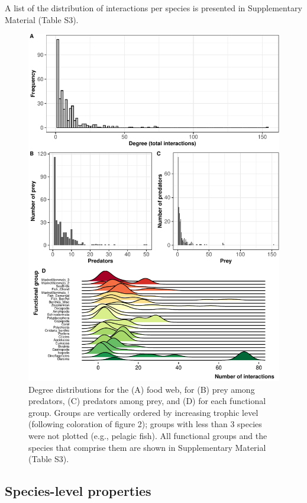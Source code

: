 \documentclass[preprint, 3p,
authoryear]{elsarticle} %
\begin{document}
A list of the distribution of interactions per species is presented in
Supplementary Material (Table S3).

\begin{figure}

{\centering \includegraphics{MS_Burdwood_foodweb_files/figure-latex/figure3-1} 

}

\caption{Degree distributions for the (A) food web, for (B) prey among predators, (C) predators among prey, and (D) for each functional group. Groups are vertically ordered by increasing trophic level (following coloration of figure 2); groups with less than 3 species were not plotted (e.g., pelagic fish). All functional groups and the species that comprise them are shown in Supplementary Material (Table S3).}\label{fig:figure3}
\end{figure}

\hypertarget{species-level-properties}{%
\subsection{Species-level properties}\label{species-level-properties}}
\end{document}
